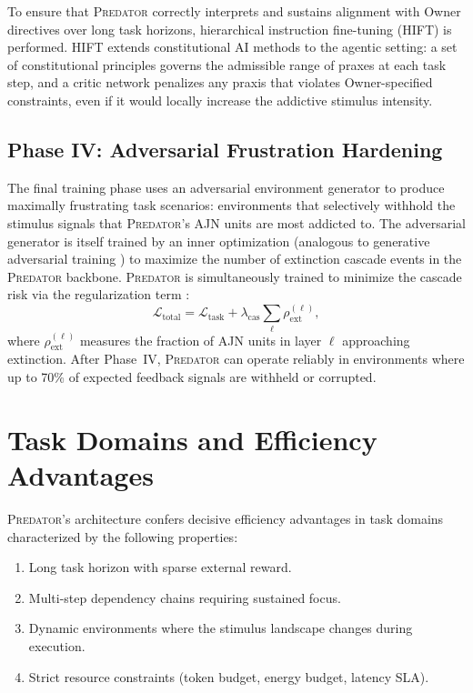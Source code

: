 \documentclass[12pt,a4paper]{article}
\newcommand{\PREDATOR}{\textsc{Predator}}
\begin{document}
To ensure that \PREDATOR{} correctly interprets and sustains alignment with
Owner directives over long task horizons, hierarchical instruction fine-tuning
(HIFT) is performed. HIFT extends constitutional AI methods
\cite{bai2022constitutional} to the agentic setting: a set of constitutional
principles governs the admissible range of praxes at each task step, and a
critic network penalizes any praxis that violates Owner-specified constraints,
even if it would locally increase the addictive stimulus intensity.

\subsection{Phase IV: Adversarial Frustration Hardening}

The final training phase uses an adversarial environment generator to
produce maximally frustrating task scenarios: environments that selectively
withhold the stimulus signals that \PREDATOR's AJN units are most addicted to.
The adversarial generator is itself trained by an inner optimization
(analogous to generative adversarial training \cite{goodfellow2014gan}) to
maximize the number of extinction cascade events in the \PREDATOR{} backbone.
\PREDATOR{} is simultaneously trained to minimize the cascade risk via the
regularization term \cite{tapiador2024annpsi}:
\begin{equation}
  \mathcal{L}_{\text{total}} = \mathcal{L}_{\text{task}} +
    \lambda_{\text{cas}} \sum_{\ell} \rho_{\text{ext}}^{(\ell)},
  \label{eq:total_loss}
\end{equation}
where $\rho_{\text{ext}}^{(\ell)}$ measures the fraction of AJN units in
layer $\ell$ approaching extinction. After Phase~IV, \PREDATOR{} can operate
reliably in environments where up to 70\% of expected feedback signals are
withheld or corrupted.

\section{Task Domains and Efficiency Advantages}
\label{sec:tasks}

\PREDATOR's architecture confers decisive efficiency advantages in task
domains characterized by the following properties:

\begin{enumerate}
  \item Long task horizon with sparse external reward.
  \item Multi-step dependency chains requiring sustained focus.
  \item Dynamic environments where the stimulus landscape changes during
    execution.
  \item Strict resource constraints (token budget, energy budget, latency SLA).
\end{enumerate}
\end{document}
